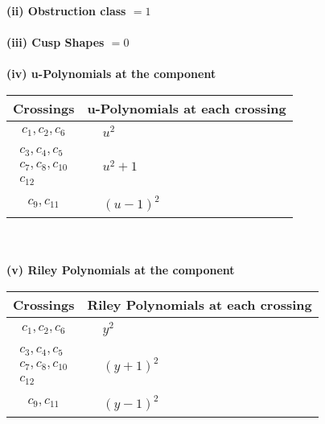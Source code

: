 \documentclass[1p]{elsarticle_modified}
\theoremstyle{definition}
\begin{document}
\flushleft \textbf{(ii) Obstruction class $= 1$}\\~\\
\flushleft \textbf{(iii) Cusp Shapes $= 0$}\\~\\
\newpage\renewcommand{\arraystretch}{1}
\flushleft \textbf{(iv) u-Polynomials at the component}\newline \\
\begin{tabular}{m{50pt}|m{274pt}}
Crossings & \hspace{64pt}u-Polynomials at each crossing \\
\hline $$\begin{aligned}c_{1},c_{2},c_{6}\end{aligned}$$&$\begin{aligned}
&u^2
\end{aligned}$\\
\hline $$\begin{aligned}c_{3},c_{4},c_{5}\\c_{7},c_{8},c_{10}\\c_{12}\end{aligned}$$&$\begin{aligned}
&u^2+1
\end{aligned}$\\
\hline $$\begin{aligned}c_{9},c_{11}\end{aligned}$$&$\begin{aligned}
&(u-1)^2
\end{aligned}$\\
\hline
\end{tabular}\\~\\
\newpage\renewcommand{\arraystretch}{1}
\flushleft \textbf{(v) Riley Polynomials at the component}\newline \\
\begin{tabular}{m{50pt}|m{274pt}}
Crossings & \hspace{64pt}Riley Polynomials at each crossing \\
\hline $$\begin{aligned}c_{1},c_{2},c_{6}\end{aligned}$$&$\begin{aligned}
&y^2
\end{aligned}$\\
\hline $$\begin{aligned}c_{3},c_{4},c_{5}\\c_{7},c_{8},c_{10}\\c_{12}\end{aligned}$$&$\begin{aligned}
&(y+1)^2
\end{aligned}$\\
\hline $$\begin{aligned}c_{9},c_{11}\end{aligned}$$&$\begin{aligned}
&(y-1)^2
\end{aligned}$\\
\hline
\end{tabular}\\~\\
\end{document}
